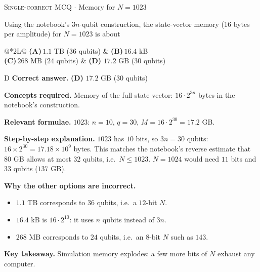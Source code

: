 \documentclass[11pt,a4paper]{article}
\newcommand{\optlabel}[1]{\textbf{(#1)}}
\newcommand{\correctlabel}[1]{\textcolor{okgreen}{\textbf{(#1)}\,\ding{51}}}
\newenvironment{qitem}[1]{\begin{list}{}{\setlength{\leftmargin}{3.3em}\setlength{\labelwidth}{3.1em}%
  \setlength{\labelsep}{0.2em}\setlength{\topsep}{3pt}\setlength{\parsep}{3pt}}\item[\textbf{Q.#1}\hfill]}{\end{list}}
\newcommand{\qsep}{\par\vspace{2pt}{\color{black!15}\hrule}\vspace{4pt}}
\newcommand{\qmeta}[2]{{\footnotesize\color{black!60}\textsc{#1} \;$\cdot$\; #2}\par}
\begin{document}
\begin{qitem}{71}
\qmeta{Single-correct MCQ}{Memory for $N = 1023$}
Using the notebook's $3n$-qubit construction, the state-vector memory (16 bytes per amplitude) for $N = 1023$ is about
\par\smallskip\noindent\begin{tabularx}{\linewidth}{@{}*{2}{L}@{}}
\optlabel{A}\,$1.1$ TB ($36$ qubits) & \optlabel{B}\,$16.4$ kB \\[3pt]
\optlabel{C}\,$268$ MB ($24$ qubits) & \correctlabel{D}\,$17.2$ GB ($30$ qubits)
\end{tabularx}
\end{qitem}
\begin{solbox}{D}
\textbf{\color{brand}Correct answer.} \textcolor{okgreen}{\textbf{(D)}} $17.2$ GB ($30$ qubits)

\textbf{\color{brand}Concepts required.} Memory of the full state vector: $16\cdot2^{3n}$ bytes in the notebook's construction.

\textbf{\color{brand}Relevant formulae.} $1023$: $n = 10$, $q = 30$, $M = 16\cdot2^{30} = 17.2$ GB.

\textbf{\color{brand}Step-by-step explanation.} $1023$ has $10$ bits, so $3n = 30$ qubits: $16\times2^{30} = 17.18\times10^9$ bytes. This matches the notebook's reverse estimate that $80$ GB allows at most
$32$ qubits, i.e.\ $N \le 1023$. $N = 1024$ would need $11$ bits and $33$ qubits ($137$ GB).

\textbf{\color{brand}Why the other options are incorrect.}
\begin{itemize}[leftmargin=2.4em, itemsep=1pt, topsep=2pt]
\item[\textbf{(A)}] $1.1$ TB corresponds to $36$ qubits, i.e.\ a $12$-bit $N$.
\item[\textbf{(B)}] $16.4$ kB is $16\cdot2^{10}$: it uses $n$ qubits instead of $3n$.
\item[\textbf{(C)}] $268$ MB corresponds to $24$ qubits, i.e.\ an $8$-bit $N$ such as $143$.
\end{itemize}
\textbf{\color{brand}Key takeaway.} Simulation memory explodes: a few more bits of $N$ exhaust any computer.
\end{solbox}
\qsep
\end{document}
